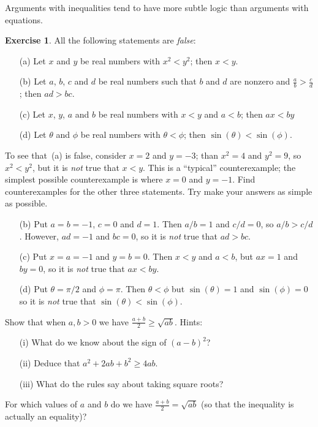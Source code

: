 \documentclass[a4paper]{book}
\newcommand{\RED}[1]{{\color{red}#1}}
\newcommand{\tht}       {\theta}
\renewcommand{\:}{\colon}
\newcommand{\EMPH}[1]{\RED{\emph{#1}}}
\theoremstyle{definition}
\newtheorem{exercise}[theorem]{Exercise}
\newenvironment{starex}{
 \renewcommand{\thetheorem}{\arabic{chapter}.\arabic{section}.\arabic{theorem}${}^*$}
 \exercise
}{\endexercise}
\renewenvironment{solution}{\SolutionInline}{\endSolutionInline}
\begin{document}
Arguments with inequalities tend to have more subtle logic than
arguments with equations.  
\begin{exercise}
 All the following statements are \EMPH{false}:
 \begin{itemize}
  \item[(a)] Let $x$ and $y$ be real numbers with $x^2<y^2$; then
   $x<y$. 
  \item[(b)] Let $a$, $b$, $c$ and $d$ be real numbers such that $b$
   and $d$ are nonzero and $\frac{a}{b}>\frac{c}{d}$; then $ad>bc$.
  \item[(c)] Let $x$, $y$, $a$ and $b$ be real numbers with $x<y$ and
   $a<b$; then $ax<by$ 
  \item[(d)] Let $\tht$ and $\phi$ be real numbers with $\theta<\phi$;
   then $\sin(\theta)<\sin(\phi)$.
 \end{itemize}
 To see that~(a) is false, consider $x=2$ and $y=-3$; than $x^2=4$ and
 $y^2=9$, so $x^2<y^2$, but it is \EMPH{not} true that $x<y$.  This is
 a ``typical'' counterexample; the simplest possible counterexample is
 where $x=0$ and $y=-1$.  Find counterexamples for the other three
 statements.  Try make your answers as simple as possible.
\end{exercise}
\begin{solution}
 \begin{itemize}
  \item[(b)] Put $a=b=-1$, $c=0$ and $d=1$.  Then $a/b=1$ and $c/d=0$,
   so $a/b>c/d$.  However, $ad=-1$ and $bc=0$, so it is \EMPH{not}
   true that $ad>bc$.
  \item[(c)] Put $x=a=-1$ and $y=b=0$.  Then $x<y$ and $a<b$, but
   $ax=1$ and $by=0$, so it is \EMPH{not} true that $ax<by$.
  \item[(d)] Put $\tht=\pi/2$ and $\phi=\pi$. Then $\tht<\phi$ but
   $\sin(\tht)=1$ and $\sin(\phi)=0$ so it is \EMPH{not} true that
   $\sin(\tht)<\sin(\phi)$.  
 \end{itemize}
\end{solution}
\begin{starex}
 Show that when $a,b>0$ we have $\frac{a+b}{2}\geq\sqrt{ab}$.
 Hints:
 \begin{itemize}
  \item[(i)] What do we know about the sign of $(a-b)^2$?
  \item[(ii)] Deduce that $a^2+2ab+b^2\geq 4ab$.
  \item[(iii)] What do the rules say about taking square roots? 
 \end{itemize}
 For which values of $a$ and $b$ do we have $\frac{a+b}{2}=\sqrt{ab}$
 (so that the inequality is actually an equality)?
\end{starex}
\end{document}
